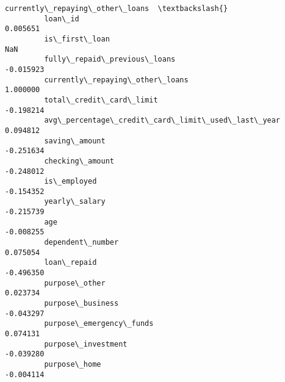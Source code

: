 \documentclass{report}
\begin{document}
\begin{Verbatim}[commandchars=\\\{\}]
                                                          currently\_repaying\_other\_loans  \textbackslash{}
         loan\_id                                                                0.005651   
         is\_first\_loan                                                               NaN   
         fully\_repaid\_previous\_loans                                           -0.015923   
         currently\_repaying\_other\_loans                                         1.000000   
         total\_credit\_card\_limit                                               -0.198214   
         avg\_percentage\_credit\_card\_limit\_used\_last\_year                        0.094812   
         saving\_amount                                                         -0.251634   
         checking\_amount                                                       -0.248012   
         is\_employed                                                           -0.154352   
         yearly\_salary                                                         -0.215739   
         age                                                                   -0.008255   
         dependent\_number                                                       0.075054   
         loan\_repaid                                                           -0.496350   
         purpose\_other                                                          0.023734   
         purpose\_business                                                      -0.043297   
         purpose\_emergency\_funds                                                0.074131   
         purpose\_investment                                                    -0.039280   
         purpose\_home                                                          -0.004114   
         

\end{Verbatim}
\end{document}
